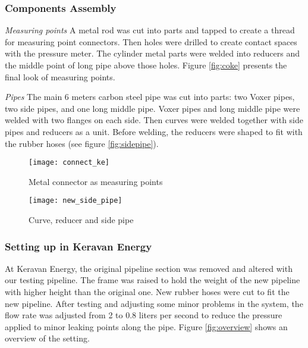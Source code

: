 \subsubsection{Components Assembly}

\textit{Measuring points}\newline
A metal rod was cut into parts and tapped to create a thread for measuring point connectors. Then holes were drilled to create contact spaces with the pressure meter. The cylinder metal parts were welded into reducers and the middle point of long pipe above those holes. Figure \vref{fig:coke} presents the final look of measuring points.

\textit{Pipes}\newline
The main 6 meters carbon steel pipe was cut into parts: two Voxer pipes, two side pipes, and one long middle pipe. Voxer pipes and long middle pipe were welded with two flanges on each side. Then curves were welded together with side pipes and reducers as a unit. Before welding, the reducers were shaped to fit with the rubber hoses (see figure \vref{fig:sidepipe}).

\begin{figure}[!htb]
   \begin{minipage}{0.48\textwidth}
     \centering
     \texttt{[image: connect\_ke]}
     \caption{Metal connector as measuring points}\label{fig:coke}
   \end{minipage}\hfill
   \begin {minipage}{0.48\textwidth}
     \centering
     \texttt{[image: new\_side\_pipe]}
     \caption{Curve, reducer and side pipe}\label{fig:sidepipe}
   \end{minipage}
\end{figure}

\subsubsection{Setting up in Keravan Energy}

At Keravan Energy, the original pipeline section was removed and altered with our testing pipeline. The frame was raised to hold the weight of the new pipeline with higher height than the original one. New rubber hoses were cut to fit the new pipeline. After testing and adjusting some minor problems in the system, the flow rate was adjusted from 2 to 0.8 liters per second to reduce the pressure applied to minor leaking points along the pipe. Figure \vref{fig:overview} shows an overview of the setting.

